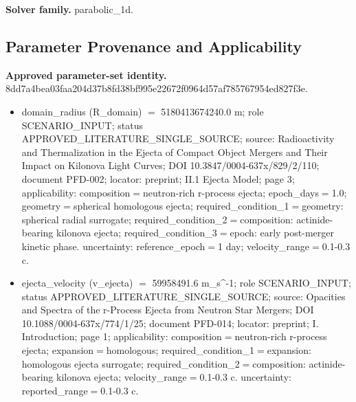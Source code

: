 \documentclass[11pt]{article}
\begin{document}
\noindent\textbf{Solver family.} parabolic\_1d.

\subsection{Parameter Provenance and Applicability}

\noindent\textbf{Approved parameter-set identity.} 8dd7a4bea03faa20\allowbreak{}4d37b8fd38bf995e\allowbreak{}22672f0964d57af7\allowbreak{}85767954ed827f3e.
\begin{itemize}\raggedright
\item domain\_\allowbreak{}radius (R\_\allowbreak{}domain) \ensuremath{=} 5180413674240.0 m; role SCENARIO\_\allowbreak{}INPUT; status APPROVED\_\allowbreak{}LITERATURE\_\allowbreak{}SINGLE\_\allowbreak{}SOURCE; source: Radioactivity and Thermalization in the Ejecta of Compact Object Mergers and Their Impact on Kilonova Light Curves; DOI 10.3847/\allowbreak{}0004-637x/\allowbreak{}829/\allowbreak{}2/\allowbreak{}110; document PFD-002; locator: preprint; II.1 Ejecta Model; page 3; applicability: composition\ensuremath{=}neutron-rich r-process ejecta; epoch\_\allowbreak{}days\ensuremath{=}1.0; geometry\ensuremath{=}spherical homologous ejecta; required\_\allowbreak{}condition\_\allowbreak{}1\ensuremath{=}geometry: spherical radial surrogate; required\_\allowbreak{}condition\_\allowbreak{}2\ensuremath{=}composition: actinide-bearing kilonova ejecta; required\_\allowbreak{}condition\_\allowbreak{}3\ensuremath{=}epoch: early post-merger kinetic phase. uncertainty: reference\_\allowbreak{}epoch\ensuremath{=}1 day; velocity\_\allowbreak{}range\ensuremath{=}0.1-0.3 c.
\item ejecta\_\allowbreak{}velocity (v\_\allowbreak{}ejecta) \ensuremath{=} 59958491.6 m\_\allowbreak{}s\textasciicircum{}-1; role SCENARIO\_\allowbreak{}INPUT; status APPROVED\_\allowbreak{}LITERATURE\_\allowbreak{}SINGLE\_\allowbreak{}SOURCE; source: Opacities and Spectra of the r-Process Ejecta from Neutron Star Mergers; DOI 10.1088/\allowbreak{}0004-637x/\allowbreak{}774/\allowbreak{}1/\allowbreak{}25; document PFD-014; locator: preprint; I. Introduction; page 1; applicability: composition\ensuremath{=}neutron-rich r-process ejecta; expansion\ensuremath{=}homologous; required\_\allowbreak{}condition\_\allowbreak{}1\ensuremath{=}expansion: homologous ejecta surrogate; required\_\allowbreak{}condition\_\allowbreak{}2\ensuremath{=}composition: actinide-bearing kilonova ejecta; velocity\_\allowbreak{}range\ensuremath{=}0.1-0.3 c. uncertainty: reported\_\allowbreak{}range\ensuremath{=}0.1-0.3 c.

\end{itemize}
\end{document}
